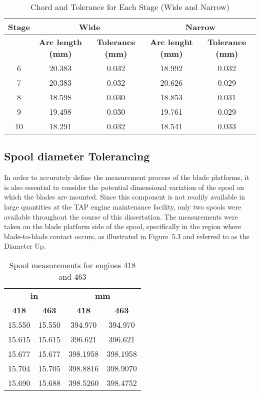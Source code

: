 \begin{table}[H]
    \centering
    \caption{Chord and Tolerance for Each Stage (Wide and Narrow)}
    \label{tab:chord_tolerance_per_stage}
    \begin{tabular}{ccccc}
        \hline
        \textbf{Stage} & \multicolumn{2}{c}{\textbf{Wide}} & \multicolumn{2}{c}{\textbf{Narrow}} \\
        \hline
         & \textbf{Arc length (mm)} & \textbf{Tolerance (mm)} & \textbf{Arc lenght (mm)} & \textbf{Tolerance (mm)} \\
        \hline
        6 & 20.383 & 0.032 & 18.992 & 0.032 \\
        7 & 20.383 & 0.032 & 20.626 & 0.029 \\
        8 & 18.598 & 0.030 & 18.853 & 0.031 \\
        9 & 19.498 & 0.030 & 19.761 & 0.029 \\
        10 & 18.291 & 0.032 & 18.541 & 0.033 \\
        \hline
    \end{tabular}
\end{table}


\subsection{Spool diameter Tolerancing}

In order to accurately define the measurement process of the blade platforms, it is also essential to consider the potential dimensional variation of the spool on which the blades are mounted. 
Since this component is not readily available in large quantities at the TAP engine maintenance facility, only two spools were available throughout the course of this dissertation. 
The measurements were taken on the blade platform side of the spool, specifically in the region where blade-to-blade contact occurs, as illustrated in Figure~5.3 and referred to as the Diameter Up.

\begin{table}[H]
    \centering
    \caption{Spool measurements for engines 418 and 463}
    \label{tab:spool_measurements}
    \begin{tabular}{cc|cc}
        \hline
        \multicolumn{2}{c|}{\textbf{in}} & \multicolumn{2}{c}{\textbf{mm}} \\
        \textbf{418} & \textbf{463} & \textbf{418} & \textbf{463} \\
        \hline
        15.550 & 15.550 & 394.970  & 394.970  \\
        15.615 & 15.615 & 396.621  & 396.621  \\
        15.677 & 15.677 & 398.1958 & 398.1958 \\
        15.704 & 15.705 & 398.8816 & 398.9070 \\
        15.690 & 15.688 & 398.5260 & 398.4752 \\
        \hline
    \end{tabular}
\end{table}

